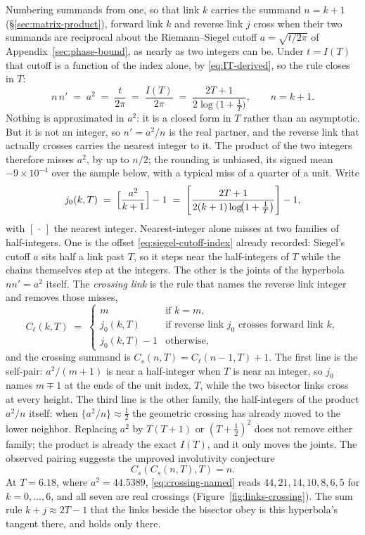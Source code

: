 \documentclass[11pt]{article}
\theoremstyle{definition}
\begin{document}
Numbering summands from one, so that link $k$
carries the summand $n=k+1$ (\S\ref{sec:matrix-product}), forward link $k$ and
reverse link $j$ cross when their two summands are reciprocal about the
Riemann--Siegel cutoff $a=\sqrt{t/2\pi}$ of Appendix~\ref{sec:phase-bound}, as
nearly as two integers can be. Under $t=I(T)$ that cutoff is a function of the
index alone, by \eqref{eq:IT-derived}, so the rule closes in $T$:
\begin{equation}\label{eq:crossing-product}
n\,n'\;=\;a^{2}\;=\;\frac{t}{2\pi}\;=\;\frac{I(T)}{2\pi}
\;=\;\frac{2T+1}{2\log\!\bigl(1+\tfrac1T\bigr)},
\qquad n=k+1.
\end{equation}
Nothing is approximated in $a^{2}$: it is a closed form in $T$ rather than an
asymptotic. But it is not an integer, so $n'=a^{2}/n$ is the real partner, and
the reverse link that actually crosses carries the nearest integer to it. The
product of the two integers therefore misses $a^{2}$, by up to $n/2$; the
rounding is unbiased, its signed mean $-9\times10^{-4}$ over the sample below,
with a typical miss of a quarter of a unit. Write
\begin{equation}\label{eq:crossing-named}
j_0(k,T)\;=\;\Bigl[\frac{a^{2}}{k+1}\Bigr]-1
\;=\;\left[\frac{2T+1}{2(k+1)\log\!\bigl(1+\tfrac1T\bigr)}\right]-1,
\end{equation}
with $[\,\cdot\,]$ the nearest integer. Nearest-integer alone misses at two
families of half-integers. One is the offset
\eqref{eq:siegel-cutoff-index} already recorded: Siegel's cutoff $a$ sits
half a link past $T$, so it steps near the half-integers of $T$ while the
chains themselves step at the integers. The other is the joints of the
hyperbola $nn'=a^{2}$ itself. The \emph{crossing link} is the
rule that names the reverse link integer and removes those misses,
\begin{equation}\label{eq:crossing-rule}
C_{\ell}(k,T)\;=\;
\begin{cases}
m & \text{if }k=m,\\[2pt]
j_0(k,T) & \text{if reverse link }j_0\text{ crosses forward link }k,\\[2pt]
j_0(k,T)-1 & \text{otherwise,}
\end{cases}
\end{equation}
and the crossing summand is $C_{s}(n,T)=C_{\ell}(n-1,T)+1$. The first line
is the self-pair: $a^{2}/(m+1)$ is near a half-integer when $T$ is near an
integer, so $j_0$ names $m\mp1$ at the ends of the unit index, $T$, while the
two bisector links cross at every height. The third line
is the other family, the half-integers of the product $a^{2}/n$ itself:
when $\{a^{2}/n\}\approx\tfrac12$ the geometric crossing has already moved
to the lower neighbor. Replacing $a^{2}$ by $T(T+1)$ or $(T+\tfrac12)^{2}$
does not remove either family; the product is already the exact $I(T)$,
and it only moves the joints. The observed pairing suggests the unproved
involutivity conjecture
\[
C_s(C_s(n,T),T)=n.
\]
At $T=6.18$, where $a^{2}=44.5389$, \eqref{eq:crossing-named} reads
$44,21,14,10,8,6,5$ for $k=0,\dots,6$, and all seven are real crossings
(Figure~\ref{fig:links-crossing}). The sum rule $k+j\approx2T-1$ that the
links beside the bisector obey is this hyperbola's tangent there, and holds
only there.
\end{document}
